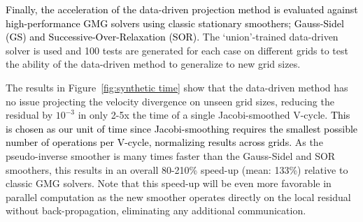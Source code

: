 \documentclass[]{elsarticle}
\begin{document}
\textcolor{black}{Finally, the acceleration of the data-driven projection method is evaluated against high-performance GMG solvers using classic stationary smoothers; Gauss-Sidel (GS) and Successive-Over-Relaxation (SOR).} The `union'-trained data-driven solver is used and 100 tests are generated for each case on different grids to test the ability of the data-driven method to generalize to new grid sizes.

The results in Figure~\ref{fig:synthetic time} show that the data-driven method has no issue projecting the velocity divergence on unseen grid sizes, reducing the residual by $10^{-3}$ in only 2-5x the time of a single Jacobi-smoothed V-cycle. \textcolor{black}{This is chosen as our unit of time since Jacobi-smoothing requires the smallest possible number of operations per V-cycle, normalizing results across grids.} As the pseudo-inverse smoother is many times faster than the Gauss-Sidel and SOR smoothers, this results in an overall 80-210\% speed-up (mean: 133\%) relative to classic GMG solvers. Note that this speed-up will be even more favorable in parallel computation as the new smoother operates directly on the local residual without back-propagation, eliminating any additional communication.
\end{document}
